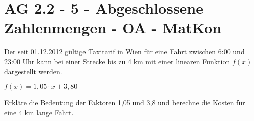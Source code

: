 \section{AG 2.2 - 5 - Abgeschlossene Zahlenmengen - OA - MatKon}

\begin{beispiel}[AG 2.2]{1} %
				Der seit 01.12.2012 gültige Taxitarif in Wien für eine Fahrt zwischen 6:00 und 23:00 Uhr kann bei einer Strecke bis zu 4 km mit einer linearen Funktion $f(x)$ dargestellt werden.
\begin{center}
$f(x)=1,05\cdot x+3,80$
\end{center}

Erkläre die Bedeutung der Faktoren 1,05 und 3,8 und berechne die Kosten für eine 4 km lange Fahrt.\\

\end{beispiel}
